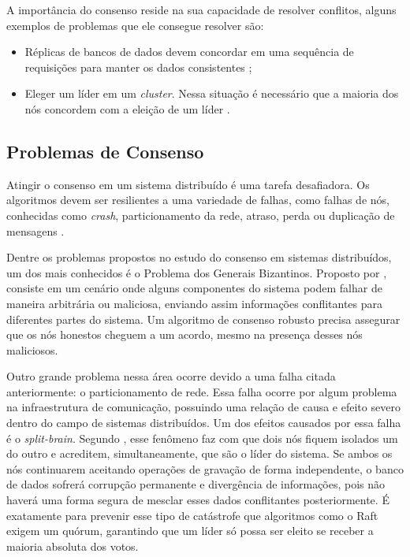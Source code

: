     A importância do consenso reside na sua capacidade de resolver conflitos, alguns exemplos de problemas que ele consegue resolver são:
    \begin{itemize}
        \item Réplicas de bancos de dados devem concordar em uma sequência de requisições para manter os dados consistentes \cite{Soares2010};
        
        \item Eleger um líder em um \textit{cluster}. Nessa situação é necessário que a maioria dos nós concordem com a eleição de um líder \cite{Bhardwaj2020}.
    \end{itemize}

    \subsection{Problemas de Consenso}
    
        Atingir o consenso em um sistema distribuído é uma tarefa desafiadora. Os algoritmos devem ser resilientes a uma variedade de falhas, como falhas de nós, conhecidas como \textit{crash}, particionamento da rede, atraso, perda ou duplicação de mensagens \cite{Bhardwaj2020}.

        Dentre os problemas propostos no estudo do consenso em sistemas distribuídos, um dos mais conhecidos é o Problema dos Generais Bizantinos. Proposto por , consiste em um cenário onde alguns componentes do sistema podem falhar de maneira arbitrária ou maliciosa, enviando assim informações conflitantes para diferentes partes do sistema. Um algoritmo de consenso robusto precisa assegurar que os nós honestos cheguem a um acordo, mesmo na presença desses nós maliciosos.  

        Outro grande problema nessa área ocorre devido a uma falha citada anteriormente: o particionamento de rede. Essa falha ocorre por algum problema na infraestrutura de comunicação, possuindo uma relação de causa e efeito severo dentro do campo de sistemas distribuídos. Um dos efeitos causados por essa falha é o \textit{split-brain}. Segundo , esse fenômeno faz com que dois nós fiquem isolados um do outro e acreditem, simultaneamente, que são o líder do sistema. Se ambos os nós continuarem aceitando operações de gravação de forma independente, o banco de dados sofrerá corrupção permanente e divergência de informações, pois não haverá uma forma segura de mesclar esses dados conflitantes posteriormente. É exatamente para prevenir esse tipo de catástrofe que algoritmos como o Raft exigem um quórum, garantindo que um líder só possa ser eleito se receber a maioria absoluta dos votos.

